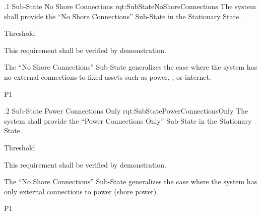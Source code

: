 \ONERQMTVKSA
{\RqtNumberBase.1}
{Sub-State No Shore Connections}
{rqt:SubStateNoShoreConnections}
{The system shall provide the ``No Shore Connections'' Sub-State in the  Stationary State.}
{
	\item [Phase 1] Threshold
}
{This requirement shall be verified by demonstration.}
{
	\item The ``No Shore Connections'' Sub-State generalizes the case where the system has no external connections to fixed assets such as power, \POTS, or internet.
}
{P1}


\ONERQMTVKSA
{\RqtNumberBase.2}
{Sub-State Power Connections Only}
{rqt:SubStatePowerConnectionsOnly}
{The system shall provide the ``Power Connections Only'' Sub-State in the Stationary State.}
{
	\item [Phase 1] Threshold
}
{This requirement shall be verified by demonstration.}

{
	\item The ``No Shore Connections'' Sub-State generalizes the case where the system has only external connections to power (shore power).
}
{P1}


